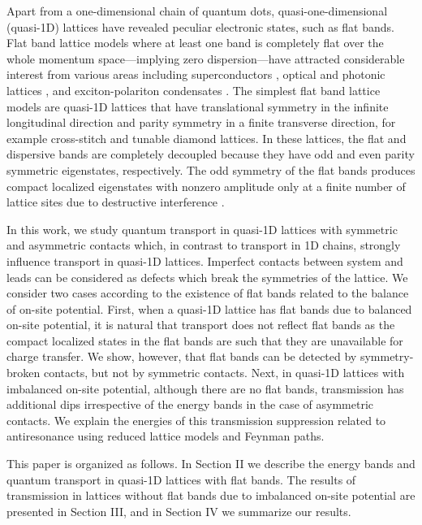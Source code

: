 \documentclass[twocolumn,showpacs,epsfig,pre]{revtex4}
\begin{document}
Apart from a one-dimensional chain of quantum dots, quasi-one-dimensional (quasi-1D) lattices have revealed peculiar electronic states, such as flat bands. Flat band lattice models where at least one band is completely flat over the whole momentum space---implying zero dispersion---have attracted considerable interest from various areas including superconductors \cite{Sim97, Den98, Ima00, Den03}, optical and photonic lattices \cite{Apa10, Hyr13, Rec13, Vic15, Muk15}, and exciton-polariton condensates \cite{Jac14, Bab16}. The simplest flat band lattice models are quasi-1D lattices that have translational symmetry in the infinite longitudinal direction and parity symmetry in a finite transverse direction, for example cross-stitch and tunable diamond lattices. In these lattices, the flat and dispersive bands are completely decoupled because they have odd and even parity symmetric eigenstates, respectively. The odd symmetry of the flat bands produces compact localized eigenstates with nonzero amplitude only at a finite number of lattice sites due to destructive interference \cite{Der06, Ber08, Der10, Fla14}.

In this work, we study quantum transport in quasi-1D lattices with symmetric and asymmetric contacts which, in contrast to transport in 1D chains, strongly influence transport in quasi-1D lattices. Imperfect contacts between system and leads can be considered as defects which break the symmetries of the lattice. We consider two cases according to the existence of flat bands related to the balance of on-site potential. First, when a quasi-1D lattice has flat bands due to balanced on-site potential, it is natural that transport does not reflect flat bands as the compact localized states in the flat bands are such that they are unavailable for charge transfer. We show, however, that flat bands can be detected by symmetry-broken contacts, but not by symmetric contacts. Next, in quasi-1D lattices with imbalanced on-site potential, although there are no flat bands, transmission has additional dips irrespective of the energy bands in the case of asymmetric contacts. We explain the energies of this transmission suppression related to antiresonance using reduced lattice models and Feynman paths.

This paper is organized as follows. In Section II we describe the energy bands and quantum transport in quasi-1D lattices with flat bands. The results of transmission in lattices without flat bands due to imbalanced on-site potential are presented in Section III, and in Section IV we summarize our results.
\end{document}
